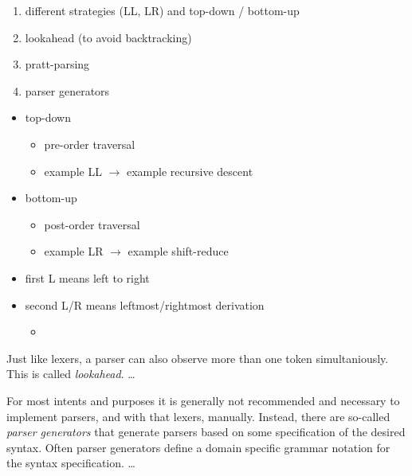 \begin{enumerate}
    \item different strategies (LL, LR) and top-down / bottom-up
    \item lookahead (to avoid backtracking)
    \item pratt-parsing
    \item parser generators
\end{enumerate}

\begin{itemize}
    \item top-down
    \begin{itemize}
        \item pre-order traversal
        \item example LL $\rightarrow$ example recursive descent
    \end{itemize}
    \item bottom-up
    \begin{itemize}
        \item post-order traversal
        \item example LR $\rightarrow$ example shift-reduce
    \end{itemize}
    \item first L means left to right
    \item second L/R means leftmost/rightmost derivation
    \begin{itemize}
        \item {}
    \end{itemize}
\end{itemize}

Just like lexers, a parser can also observe more than one token simultaniously.
This is called \emph{lookahead}.
\ldots

For most intents and purposes it is generally not recommended and necessary to implement parsers, and with that lexers, manually.
Instead, there are so-called \emph{parser generators} that generate parsers based on some specification of the desired syntax.
Often parser generators define a domain specific grammar notation for the syntax specification.
\ldots
